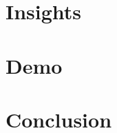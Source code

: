 \documentclass[11pt,a4paper]{article}
\begin{document}
  \section {Insights}
    \label{insights}

  \section {Demo}
  \section {Conclusion}

  
  




  
\end{document}
